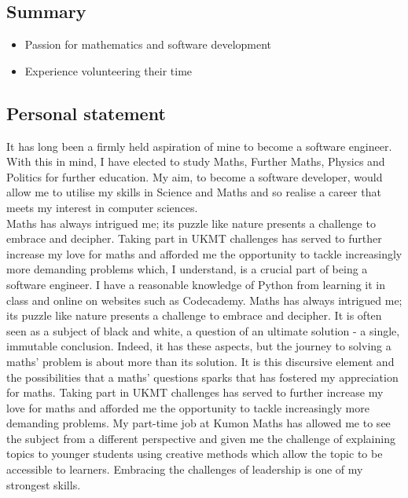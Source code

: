 \documentclass{article}
\begin{document}
\subsection*{Summary}
\begin{itemize}
    \item Passion for mathematics and software development
    \item Experience volunteering their time
\end{itemize}

\subsection*{Personal statement}

It has long been a firmly held aspiration of mine to become a software engineer.
With this in mind, I have elected to study Maths, Further Maths, Physics and
Politics for further education. My aim, to become a software developer, would
allow me to utilise my skills in Science and Maths and so realise a career that
meets my interest in computer sciences.\\

Maths has always intrigued me; its puzzle like nature presents a challenge to
embrace and decipher. Taking part in UKMT challenges has served to further
increase my love for maths and afforded me the opportunity to tackle
increasingly more demanding problems which, I understand, is a crucial part of
being a software engineer. I have a reasonable knowledge of Python from learning
it in class and online on websites such as Codecademy. Maths has always
intrigued me; its puzzle like nature presents a challenge to embrace and
decipher. It is often seen as a subject of black and white, a question of an
ultimate solution - a single, immutable conclusion. Indeed, it has these
aspects, but the journey to solving a maths’ problem is about more than its
solution. It is this discursive element and the possibilities that a maths’
questions sparks that has fostered my appreciation for maths. Taking part in
UKMT challenges has served to further increase my love for maths and afforded me
the opportunity to tackle increasingly more demanding problems. My part-time job
at Kumon Maths has allowed me to see the subject from a different perspective
and given me the challenge of explaining topics to younger students using
creative methods which allow the topic to be accessible to learners. Embracing
the challenges of leadership is one of my strongest skills.\\
\end{document}

